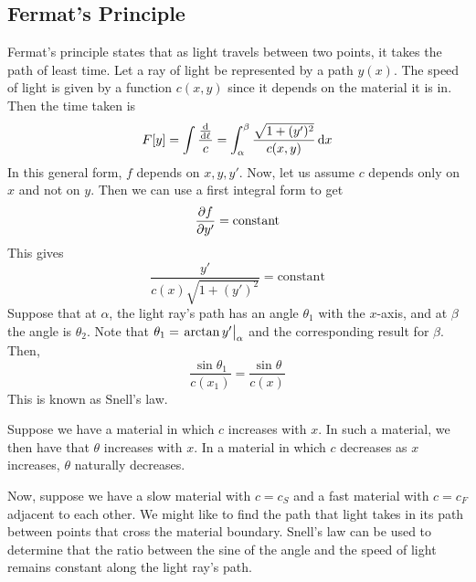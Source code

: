 \subsection{Fermat's Principle}
Fermat's principle states that as light travels between two points, it takes the path of least time. Let a ray of light be represented by a path \( y(x) \). The speed of light is given by a function \( c(x, y) \) since it depends on the material it is in. Then the time taken is
\[ F[y] = \int \frac{\dv{\ell}}{c} = \int_\alpha^\beta \frac{\sqrt{1 + (y')^2}}{c(x, y)} \dd{x} \]
In this general form, \( f \) depends on \( x, y, y' \). Now, let us assume \( c \) depends only on \( x \) and not on \( y \). Then we can use a first integral form to get
\[ \pdv{f}{y'} = \text{constant} \]
This gives
\[ \frac{y'}{c(x)\sqrt{1 + (y')^2}} = \text{constant} \]
Suppose that at \( \alpha \), the light ray's path has an angle \( \theta_1 \) with the \( x \)-axis, and at \( \beta \) the angle is \( \theta_2 \). Note that \( \theta_1 = \eval{\arctan y'}_{\alpha} \) and the corresponding result for \( \beta \). Then,
\[ \frac{\sin\theta_1}{c(x_1)} = \frac{\sin\theta}{c(x)} \]
This is known as Snell's law.

Suppose we have a material in which \( c \) increases with \( x \). In such a material, we then have that \( \theta \) increases with \( x \). In a material in which \( c \) decreases as \( x \) increases, \( \theta \) naturally decreases.

Now, suppose we have a slow material with \( c = c_S \) and a fast material with \( c = c_F \) adjacent to each other. We might like to find the path that light takes in its path between points that cross the material boundary. Snell's law can be used to determine that the ratio between the sine of the angle and the speed of light remains constant along the light ray's path.
